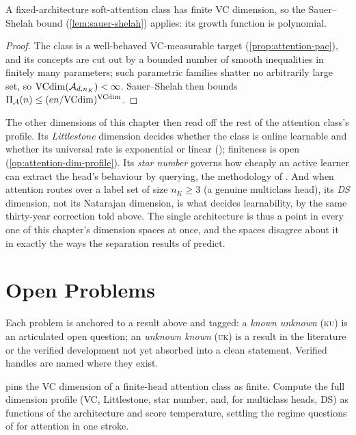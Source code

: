 \begin{prop}
\label{prop:attention-vc-dim}
A fixed-architecture soft-attention class has finite VC dimension, so the Sauer--Shelah bound (\cref{lem:sauer-shelah}) applies: its growth function is polynomial.
\end{prop}

\begin{proof}
The class is a well-behaved VC-measurable target (\cref{prop:attention-pac}), and its concepts are cut out by a bounded number of smooth inequalities in finitely many parameters; such parametric families shatter no arbitrarily large set, so $\mathrm{VCdim}(\mathcal{A}_{d,n_K}) < \infty$.  Sauer--Shelah then bounds $\Pi_{\mathcal{A}}(n) \leq (en/\mathrm{VCdim})^{\mathrm{VCdim}}$.
\end{proof}

The other dimensions of this chapter then read off the rest of the attention class's profile.  Its \emph{Littlestone} dimension decides whether the class is online learnable and whether its universal rate is exponential or linear (); finiteness is open (\cref{op:attention-dim-profile}).  Its \emph{star number} governs how cheaply an active learner can extract the head's behaviour by querying, the methodology of .  And when attention routes over a label set of size $n_K \geq 3$ (a genuine multiclass head), its \emph{DS} dimension, not its Natarajan dimension, is what decides learnability, by the same thirty-year correction told above.  The single architecture is thus a point in every one of this chapter's dimension spaces at once, and the spaces disagree about it in exactly the ways the separation results of  predict.

\section{Open Problems}
\label{sec:ch10-open}

Each problem is anchored to a result above and tagged: a \emph{known unknown} (\textsc{ku}) is an articulated open question; an \emph{unknown known} (\textsc{uk}) is a result in the literature or the verified development not yet absorbed into a clean statement.  Verified handles are named where they exist.

\begin{openprob}
\label{op:attention-dim-profile}
 pins the VC dimension of a finite-head attention class as finite.  Compute the full dimension profile (VC, Littlestone, star number, and, for multiclass heads, DS) as functions of the architecture and score temperature, settling the regime questions of  for attention in one stroke.
\end{openprob}


